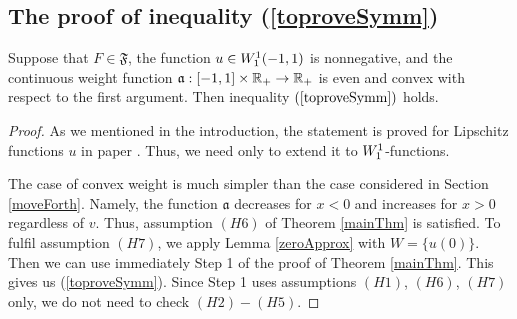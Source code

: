 \subsection{The proof of inequality (\ref{toproveSymm})}
\label{sobolevSymm}

\begin{thm}
\label{symmThm}
Suppose that $F \in \mathfrak{F}$, the function $u \in W_1^1(-1, 1)$ is nonnegative,
and the continuous weight function $\mathfrak a: [-1, 1] \times \mathbb R_+ \to \mathbb R_+$
is even and convex with respect to the first argument.
Then inequality $(\ref{toproveSymm})$ holds.
\end{thm}

\begin{proof}
As we mentioned in the introduction,
the statement is proved for Lipschitz functions $u$ in paper \cite{Brock}.
Thus, we need only to extend it to $W_1^1$-functions.

The case of convex weight is much simpler than the case considered in Section \ref{moveForth}.
Namely, the function $\mathfrak a$ decreases for $x < 0$ and increases for $x > 0$ regardless of $v$.
Thus, assumption $(H6)$ of Theorem \ref{mainThm} is satisfied.
To fulfil assumption $(H7)$, we apply Lemma \ref{zeroApprox} with $W = \{ u(0) \}$.
Then we can use immediately Step 1 of the proof of Theorem \ref{mainThm}.
This gives us (\ref{toproveSymm}).
Since Step 1 uses assumptions $(H1)$, $(H6)$, $(H7)$ only,
we do not need to check $(H2)-(H5)$.
\end{proof}
